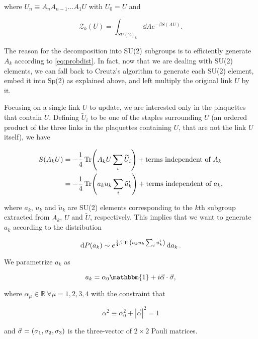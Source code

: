 \documentclass[reqno,12pt]{article}
\numberwithin{equation}{section}
\newcommand{\id}{\mathbbm{1}}
\begin{document}
where $U_{n} \equiv A_n A_{n-1} \dots A_1 U$ with $U_0 = U$ and 

\begin{equation}
	\mathcal{Z}_k(U) = \int_{SU(2)_k} \dd{A} e^{-\beta S(AU)}.
\end{equation}


The reason for the decomposition into SU(2) subgroups is to efficiently generate $A_k$ according to 
\eqref{eq:probdist}. In fact, now that we are dealing with SU(2) elements, we can fall back to Creutz's
algorithm \cite{creutz} to generate each SU(2) element, embed it into Sp(2) as explained above, and left multiply
the original link $U$ by it. 

Focusing on a single link $U$ to update, we are interested only in the plaquettes that contain $U$. Defining
$\widetilde{U}_i$ to be one of the staples surrounding $U$ (an ordered product of the three links in the plaquettes
containing $U$, that are not the link $U$ itself), we have 

\begin{align}
	S(A_k U) &= -\frac{1}{4} \Tr(A_k U \sum_i \widetilde{U}_i) + \text{terms independent of } A_k \\
	&= -\frac{1}{4} \Tr(a_k u_k \sum_i \tilde{u}_k^i) + \text{terms independent of } a_k, 
\end{align}

where $a_k$, $u_k$ and $\tilde{u}_k$ are SU(2) elements corresponding to the $k$th
subgroup extracted from $A_k$, $U$ and $\widetilde{U}$, respectively. This implies that we want to generate
$a_k$ according to the distribution

\begin{equation}
	\dd{P(a_k)} \sim e^{\frac{1}{4}\beta\Tr(a_k u_k \sum_i \tilde{u}_k^i)} \dd{a_k}.
\end{equation}

We parametrize $a_k$ as

\begin{equation} \label{eq:su2parametrization}
	a_k = \alpha_0 \id + i \vec{\alpha} \cdot \vec{\sigma},
\end{equation}

where $\alpha_\mu \in \mathbb{R} \ \forall \mu = 1, 2, 3, 4$ with the constraint that 

\begin{equation}
	\alpha^2 \equiv \alpha_0^2 + |\vec{\alpha}|^2 = 1
\end{equation} 

and $\vec{\sigma} = \qty(\sigma_1, \sigma_2, \sigma_3)$ is the three-vector of $2 \times 2$ Pauli matrices. 
\end{document}
